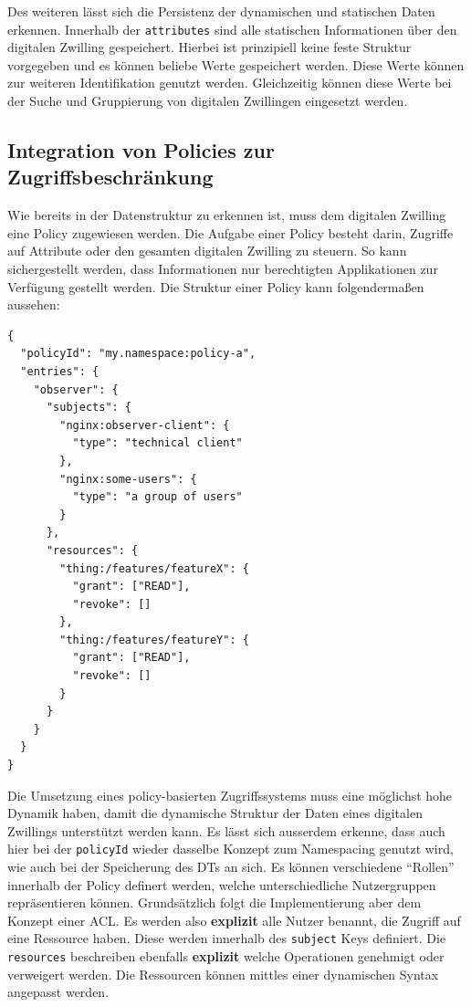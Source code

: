 Des weiteren lässt sich die Persistenz der dynamischen und statischen Daten erkennen. Innerhalb der \texttt{attributes} sind alle statischen Informationen über den digitalen Zwilling gespeichert. Hierbei ist prinzipiell keine feste Struktur vorgegeben und es können beliebe Werte gespeichert werden. Diese Werte können zur weiteren Identifikation genutzt werden. Gleichzeitig können diese Werte bei der Suche und Gruppierung von digitalen Zwillingen eingesetzt werden.

\subsection{Integration von Policies zur Zugriffsbeschränkung}

Wie bereits in der Datenstruktur zu erkennen ist, muss dem digitalen Zwilling eine Policy zugewiesen werden. Die Aufgabe einer Policy besteht darin, Zugriffe auf Attribute oder den gesamten digitalen Zwilling zu steuern. So kann sichergestellt werden, dass Informationen nur berechtigten Applikationen zur Verfügung gestellt werden. Die Struktur einer Policy kann folgendermaßen aussehen:

\begin{verbatim}
{
  "policyId": "my.namespace:policy-a",
  "entries": {
    "observer": {
      "subjects": {
        "nginx:observer-client": {
          "type": "technical client"
        },
        "nginx:some-users": {
          "type": "a group of users"
        }
      },
      "resources": {
        "thing:/features/featureX": {
          "grant": ["READ"],
          "revoke": []
        },
        "thing:/features/featureY": {
          "grant": ["READ"],
          "revoke": []
        }
      }
    }
  }
}
\end{verbatim}

Die Umsetzung eines policy-basierten Zugriffssystems muss eine möglichst hohe Dynamik haben, damit die dynamische Struktur der Daten eines digitalen Zwillings unterstützt werden kann. Es lässt sich ausserdem erkenne, dass auch hier bei der \texttt{policyId} wieder dasselbe Konzept zum Namespacing genutzt wird, wie auch bei der Speicherung des \ac{DT}s an sich. Es können verschiedene \enquote{Rollen} innerhalb der Policy definert werden, welche unterschiedliche Nutzergruppen repräsentieren können. Grundsätzlich folgt die Implementierung aber dem Konzept einer \ac{ACL}. Es werden also \textbf{explizit} alle Nutzer benannt, die Zugriff auf eine Ressource haben. Diese werden innerhalb des \texttt{subject} Keys definiert. Die \texttt{resources} beschreiben ebenfalls \textbf{explizit} welche Operationen genehmigt oder verweigert werden. Die Ressourcen können mittles einer dynamischen Syntax angepasst werden.

